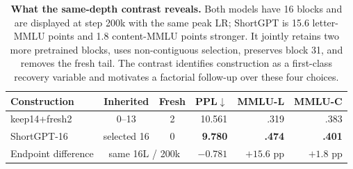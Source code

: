 \begin{table}[t]
\centering
\scriptsize
\setlength{\tabcolsep}{2.2pt}
\begin{tabular}{@{}lccrrr@{}}
\toprule
\textbf{Construction} & \textbf{Inherited} & \textbf{Fresh} &
\textbf{PPL}$\downarrow$ & \textbf{MMLU-L} & \textbf{MMLU-C} \\
\midrule
keep14+fresh2 & 0--13 & 2 & 10.561 & .319 & .383 \\
ShortGPT-16 & selected 16 & 0 & \textbf{9.780} & \textbf{.474} &
\textbf{.401} \\
\midrule
Endpoint difference & \multicolumn{2}{c}{same 16L / 200k} & $-0.781$ &
$+15.6$ pp & $+1.8$ pp \\
\bottomrule
\end{tabular}
\caption{\textbf{What the same-depth contrast reveals.} Both models have 16
blocks and are displayed at step 200k with the same peak LR; ShortGPT is
15.6 letter-MMLU points and 1.8 content-MMLU points stronger. It jointly
retains two more pretrained blocks, uses
non-contiguous selection, preserves block 31, and removes the fresh tail. The
contrast identifies construction as a first-class recovery variable and
motivates a factorial follow-up over these four choices.}
\label{tab:construction-audit}
\end{table}
